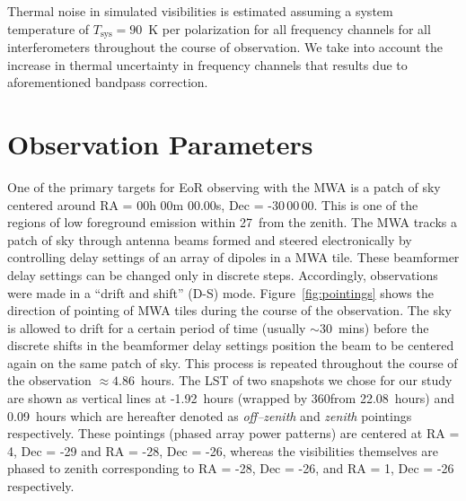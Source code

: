 \documentclass[preprint2,iop,numberedappendix]{emulateapj}
\begin{document}
Thermal noise in simulated visibilities is estimated assuming a system temperature of $T_\textrm{sys}=90$~K per polarization for all frequency channels for all interferometers throughout the course of observation. We take into account the increase in thermal uncertainty in frequency channels that results due to aforementioned bandpass correction. 

\section{Observation Parameters}\label{sec:obsparms}

One of the primary targets for EoR observing with the MWA is a patch of sky centered around RA = 00h 00m 00.00s, Dec = -30\arcdeg$\,$00\arcmin$\,$00. This is one of the regions of low foreground emission within 27\arcdeg$\,$ from the zenith. The MWA tracks a patch of sky through antenna beams formed and steered electronically by controlling delay settings of an array of dipoles in a MWA tile. These beamformer delay settings can be changed only in discrete steps. Accordingly, observations were made in a ``drift and shift'' (D-S) mode. Figure~\ref{fig:pointings} shows the direction of pointing of MWA tiles during the course of the observation. The sky is allowed to drift for a certain period of time (usually $\sim 30$~mins) before the discrete shifts in the beamformer delay settings position the beam to be centered again on the same patch of sky. This process is repeated throughout the course of the observation $\approx 4.86$~hours. The LST of two snapshots we chose for our study are shown as vertical lines at -1.92~hours (wrapped by 360\arcdeg from 22.08~hours) and 0.09~hours which are hereafter denoted as {\it off--zenith} and {\it zenith} pointings respectively. These pointings (phased array power patterns) are centered at RA = 4, Dec = -29 and RA = -28, Dec = -26, whereas the visibilities themselves are phased to zenith corresponding to RA = -28, Dec = -26, and RA = 1, Dec = -26 respectively. 
\end{document}
